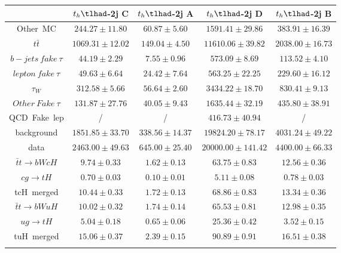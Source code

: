 \begin{tabular}{ccccc} \toprule\toprule
 & $t_{h}\tlhad$-2j C & $t_{h}\tlhad$-2j A & $t_{h}\tlhad$-2j D & $t_{h}\tlhad$-2j B\\\midrule
Other~MC & $244.27\pm11.80$ & $60.87\pm5.60$ & $1591.41\pm29.86$ & $383.91\pm16.39$\\
$t\bar{t}$ & $1069.31\pm12.02$ & $149.04\pm4.50$ & $11610.06\pm39.82$ & $2038.00\pm16.73$\\
$b-jets~fake~\tau$ & $44.19\pm2.29$ & $7.55\pm0.96$ & $573.09\pm8.69$ & $113.52\pm4.10$\\
$lepton~fake~\tau$ & $49.63\pm6.64$ & $24.42\pm7.64$ & $563.25\pm22.25$ & $229.60\pm16.12$\\
$\tau_{W}$ & $312.58\pm5.66$ & $56.64\pm2.60$ & $3434.22\pm18.70$ & $830.41\pm9.13$\\
$Other~Fake~\tau$ & $131.87\pm27.76$ & $40.05\pm9.43$ & $1635.44\pm32.19$ & $435.80\pm38.91$\\
QCD~Fake~lep &  / &  / & $416.73\pm40.94$ &  /\\
background & $1851.85\pm33.70$ & $338.56\pm14.37$ & $19824.20\pm78.17$ & $4031.24\pm49.22$\\
data & $2463.00\pm49.63$ & $645.00\pm25.40$ & $20000.00\pm141.42$ & $4400.00\pm66.33$\\
$\bar{t}t\to bWcH$ & $9.74\pm0.33$ & $1.62\pm0.13$ & $63.75\pm0.83$ & $12.56\pm0.36$\\
$cg\to tH$ & $0.70\pm0.03$ & $0.10\pm0.01$ & $5.11\pm0.08$ & $0.78\pm0.03$\\
tcH~merged & $10.44\pm0.33$ & $1.72\pm0.13$ & $68.86\pm0.83$ & $13.34\pm0.36$\\
$\bar{t}t\to bWuH$ & $10.02\pm0.32$ & $1.74\pm0.14$ & $65.53\pm0.81$ & $12.98\pm0.35$\\
$ug\to tH$ & $5.04\pm0.18$ & $0.65\pm0.06$ & $25.36\pm0.42$ & $3.52\pm0.15$\\
tuH~merged & $15.06\pm0.37$ & $2.39\pm0.15$ & $90.89\pm0.91$ & $16.51\pm0.38$\\
\bottomrule\bottomrule\\
\end{tabular}
